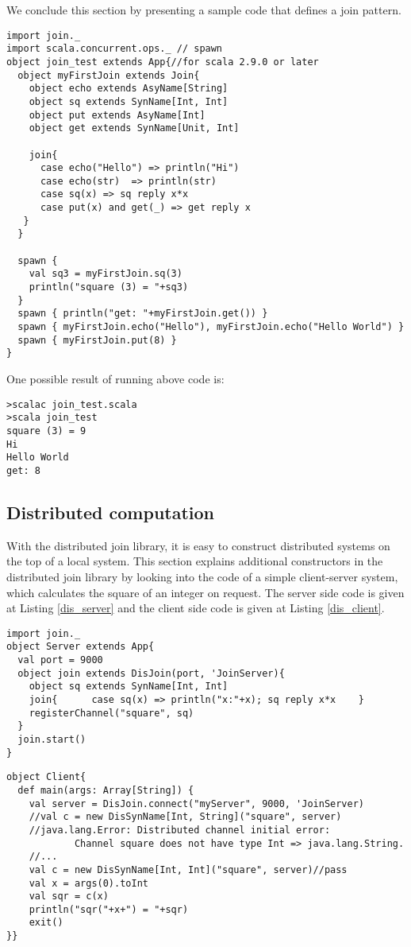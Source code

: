 We conclude this section by presenting a sample code that defines a join pattern.

\begin{lstlisting}[label=local_join_def_example, caption=Example code for defining channels and join patterns (join\_test.scala)]
import join._
import scala.concurrent.ops._ // spawn
object join_test extends App{//for scala 2.9.0 or later
  object myFirstJoin extends Join{
    object echo extends AsyName[String]
    object sq extends SynName[Int, Int]
    object put extends AsyName[Int]
    object get extends SynName[Unit, Int]

    join{
      case echo("Hello") => println("Hi")
      case echo(str)  => println(str)
      case sq(x) => sq reply x*x
      case put(x) and get(_) => get reply x
   }
  }

  spawn {
    val sq3 = myFirstJoin.sq(3)
    println("square (3) = "+sq3)
  }
  spawn { println("get: "+myFirstJoin.get()) }
  spawn { myFirstJoin.echo("Hello"), myFirstJoin.echo("Hello World") }
  spawn { myFirstJoin.put(8) }
}
\end{lstlisting}
One possible result of running above code is:
\begin{lstlisting}
>scalac join_test.scala
>scala join_test
square (3) = 9
Hi
Hello World
get: 8
\end{lstlisting}



\subsection{Distributed computation}


With the distributed join library, it is easy to construct distributed systems on the top of a local system.  This section explains additional constructors in the distributed join library by looking into the code of a simple client-server system, which calculates the square of an integer on request.  The server side code is given at Listing \ref{dis_server} and the client side code is given at Listing \ref{dis_client}.

\newpage

\begin{lstlisting}[label=dis_server, caption=Server.scala]
import join._
object Server extends App{
  val port = 9000
  object join extends DisJoin(port, 'JoinServer){
    object sq extends SynName[Int, Int]
    join{      case sq(x) => println("x:"+x); sq reply x*x    }
    registerChannel("square", sq)
  }
  join.start()
}
\end{lstlisting}
\begin{lstlisting}[label=dis_client, caption=Client.scala]
object Client{
  def main(args: Array[String]) {
    val server = DisJoin.connect("myServer", 9000, 'JoinServer)
    //val c = new DisSynName[Int, String]("square", server)
    //java.lang.Error: Distributed channel initial error: 
            Channel square does not have type Int => java.lang.String.
    //...
    val c = new DisSynName[Int, Int]("square", server)//pass
    val x = args(0).toInt
    val sqr = c(x)
    println("sqr("+x+") = "+sqr)
    exit()
}}
\end{lstlisting}

